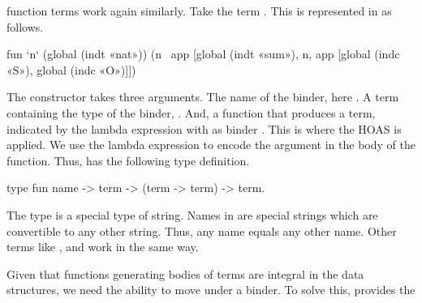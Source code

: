 \documentclass[thesis.tex]{subfiles}
\begin{document}
{{\coq function terms work again similarly. Take the \coq term . This is represented in \elpi as follows.
\begin{elpicode}
  fun `n` (global (indt «nat»)) 
            (n \ app [global (indt «sum»), 
                      n, app [global (indc «S»), 
                              global (indc «O»)]])
\end{elpicode}
The  constructor takes three arguments. The name of the binder, here . A term containing the type of the binder, . And, a function that produces a term, indicated by the lambda expression with as binder . This is where the HOAS is applied. We use the \elpi lambda expression to encode the argument in the body of the function. Thus,  has the following type definition.
\begin{elpicode}
  type fun name -> term -> (term -> term) -> term.
\end{elpicode}
The type  is a special type of string. Names in \elpi are special strings which are convertible to any other string. Thus, any name equals any other name. Other \coq terms like ,  and  work in the same way.

Given that functions generating bodies of terms are integral in the \ce data structures, we need the ability to move under a binder. To solve this, \elpi provides the }}
\end{document}
